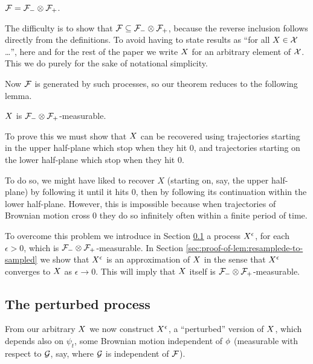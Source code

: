 {\begin{theorem}\label{thm:recoveringfromhalfplanes}
  $\mathcal{F} = \mathcal{F}_{-} \otimes \mathcal{F}_{+}$.
\end{theorem}

The difficulty is to show that $\mathcal{F} \subseteq \mathcal{F}_{-} \otimes \mathcal{F}_{+}$,
because the reverse inclusion follows directly from the definitions.
To avoid having to state results as ``for all $X \in \mathcal{X}$
\ldots'', here and for the rest of the paper we write $X$ for
an arbitrary element of $\mathcal{X}$.  This we do purely for the sake of
notational simplicity.

Now $\mathcal{F}$ is generated by such processes, so
our theorem reduces to the following lemma.

\begin{lemma}
  \label{lem:sampled-twostrip-meas}
  $X$ is $\mathcal{F}_{-} \otimes \mathcal{F}_{+}$-measurable.
\end{lemma}

To prove this we must show that $X$ can be recovered using
trajectories starting in the upper half-plane which stop when they hit
$0$, and trajectories starting on the lower half-plane which stop when
they hit $0$.

To do so, we might have liked to recover $X$ (starting on, say, the
upper half-plane) by following it until it hits 0, then by following its
continuation within the lower half-plane.  However, this is impossible
because when trajectories of Brownian motion cross $0$ they do so
infinitely often within a finite period of time.

To overcome this problem we introduce in Section
\ref{subsec:the-perturbed-process} a process $X^{\epsilon}$, for each
$\epsilon > 0$, which is $\mathcal{F}_{-} \otimes \mathcal{F}_{+}$-measurable.  In Section
\ref{sec:proof-of-lem:resamplede-to-sampled} we show that
$X^{\epsilon}$ is an approximation of $X$ in the sense that
$X^{\epsilon}$ converges to $X$ as $\epsilon \to 0$.  This will
imply that $X$ itself is $\mathcal{F}_{-} \otimes \mathcal{F}_{+}$-measurable.

\subsection{The perturbed process}
\label{subsec:the-perturbed-process}


{
\newcommand{\joinernoargs}{\psi}
\newcommand{\joiner}[2]{\joinernoargs_{{#1}{#2}}}
\newcommand{\joinerval}[1]{\joinernoargs_{#1}}
  From our arbitrary $X$ we now construct $X^{\epsilon}$, a
  ``perturbed'' version of $X$, which depends also on
  $\joinerval{t}$,
  some Brownian motion independent of $\phi$ (measurable with
  respect to $\mathcal{G}$, say, where $\mathcal{G}$ is independent of
  $\mathcal{F}$).

}}
